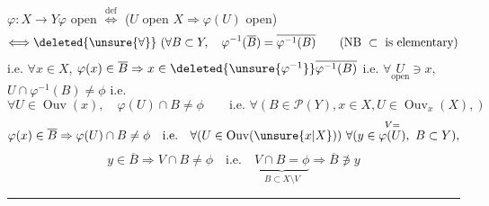 $\varphi:X\longrightarrow Y$\qquad $\varphi$ open $\overset{\mathrm{def}}\Longleftrightarrow$ ($U$ open  $X\Rightarrow\varphi(U)$ open)
\[
\Longleftrightarrow\deleted{\unsure{\forall}}\ (\forall B\subset Y,\quad\varphi^{-1}(\overline B)=\overline{\varphi^{-1}(B)}
\qquad(\text{NB }\subset\text{ is elementary})
\]
i.e. $\forall x\in X$, $\varphi(x)\in\overline B\Rightarrow x\in\deleted{\unsure{\varphi^{-1}}}\overline{\varphi^{-1}(B)}$
i.e. $\forall\underset{\mathrm{open}}{U}\ni x$, $U\cap\varphi^{-1}(B)\ne\phi$ i.e.
\[
\forall U\in\operatorname{Ouv}(x),\quad\varphi(U)\cap B\ne\phi
\qquad\text{i.e. }\forall(B\in\mathcal P(Y),x\in X,U\in\operatorname{Ouv}_x(X),)
\]
\[
\varphi(x)\in\overline B\Rightarrow\varphi(U)\cap B\ne\phi\quad\text{i.e.}\quad
\forall(U\in\operatorname{Ouv}(\unsure{x|X}))\ \forall(y\in\overset{V=}{\varphi(U)},\ B\subset Y),
\]
\[
y\in\overline B\Rightarrow V\cap B\ne\phi\quad\text{i.e.}\quad
\underbrace{V\cap B=\phi}_{B\subset X\setminus V}\Rightarrow\overline B\not\ni y
\]

\par\noindent\rule{0.95\linewidth}{0.4pt}\par

